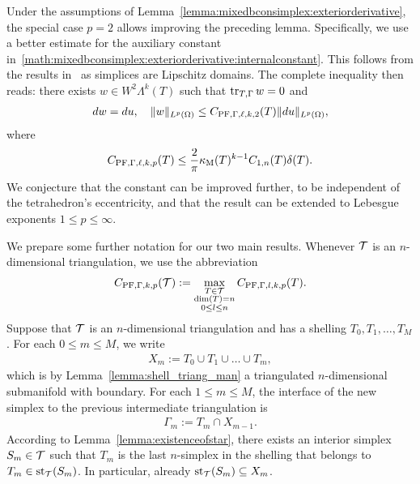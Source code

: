 \documentclass[10pt,a4paper]{article}
\begin{document}
\begin{remark}\label{remark:mixedbconsimplex:exteriorderivative:hilbert}
    Under the assumptions of Lemma~\ref{lemma:mixedbconsimplex:exteriorderivative}, 
    the special case $p=2$ allows improving the preceding lemma.
    Specifically, we use a better estimate for the auxiliary constant in~\eqref{math:mixedbconsimplex:exteriorderivative:internalconstant}.
    This follows from the results in~\cite{licht2024geometry} as simplices are Lipschitz domains.
    The complete inequality then reads: 
    there exists $w \in W^{2}\Lambda^{k}(T)$ such that 
    $\operatorname{tr}_{T,\Gamma} w = 0$
    and  
    \begin{align*}
        d w = d u,
        \quad 
        \| w \|_{L^{p}(\Omega)} 
        \leq 
        C_{{\rm PF},\Gamma,\ell,k,2}(T)
        \| d u \|_{L^{p}(\Omega)}
        ,
    \end{align*}
    where 
    \begin{align*}
        C_{{\rm PF},\Gamma,\ell,k,p}(T)
        \leq 
        \frac{2}{\pi}
        \kappa_{\rm M}(T)^{k-1}
        C_{1,n}(T) 
        {\delta}(T)
        .
    \end{align*}
    We conjecture that the constant can be improved further, to be independent of the tetrahedron's eccentricity,
    and that the result can be extended to Lebesgue exponents $1 \leq p \leq \infty$.
\end{remark}





We prepare some further notation for our two main results. 
Whenever ${\mathcal T}$ is an $n$-dimensional triangulation, we use the abbreviation
\begin{align*}
    C_{{\rm PF},\Gamma,k,p}({\mathcal T}) 
    :=
    \max\limits_{ \substack{ T \in {\mathcal T} \\ \dim(T)=n \\ 0 \leq l \leq n } }
    C_{{\rm PF},\Gamma,l,k,p}(T)
    .
\end{align*}
Suppose that ${\mathcal T}$ is an $n$-dimensional triangulation and has a shelling $T_{0}, T_{1}, \dots, T_{M}$. 
For each $0 \leq m \leq M$, we write 
\begin{align*}
    X_{m} := T_0 \cup T_1 \cup \dots \cup T_{m},
\end{align*}
which is by Lemma~\ref{lemma:shell_triang_man} a triangulated $n$-dimensional submanifold with boundary. 
For each $1 \leq m \leq M$, the interface of the new simplex to the previous intermediate triangulation is 
\begin{align*}
    \Gamma_{m} := T_{m} \cap X_{m-1} %
    .
\end{align*}
According to Lemma~\ref{lemma:existenceofstar}, 
there exists an interior simplex $S_{m} \in {\mathcal T}$ 
such that $T_{m}$ is the last $n$-simplex in the shelling that belongs to $T_{m} \in \operatorname{st}_{{\mathcal T}}(S_{m})$.
In particular, already $\operatorname{st}_{{\mathcal T}}(S_{m}) \subseteq X_{m}$. %
\end{document}

